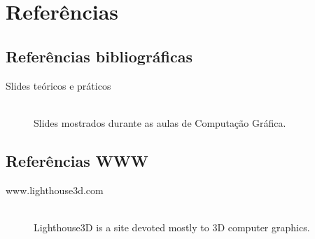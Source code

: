 \documentclass[a5paper,onecolumn, 11pt]{article}
\begin{document}
\clearpage
\section{Referências}

\subsection{Referências bibliográficas}
\begin{description}
	\item[Slides teóricos e práticos] \hfill \\
	Slides mostrados durante as aulas de Computação Gráfica.
\end{description}

\subsection{Referências WWW}
\begin{description}
	\item[www.lighthouse3d.com] \hfill \\
	Lighthouse3D is a site devoted mostly to 3D computer graphics.
\end{description}

\clearpage
\onecolumn
\end{document}
